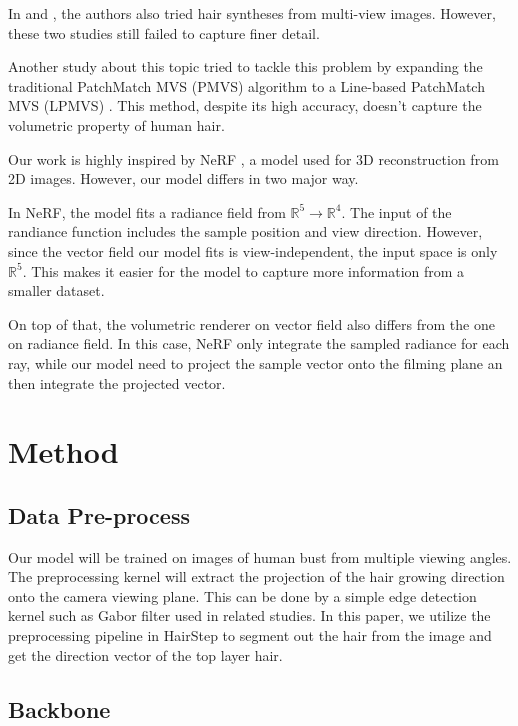 \documentclass[12pt]{article}
\begin{document}
  In \cite{sklyarova_neural_2023} and \cite{rosu_neural_2022}, the authors also tried hair syntheses from multi-view images. However, these two studies still failed to capture finer detail.

  Another study about this topic tried to tackle this problem by expanding the traditional PatchMatch MVS (PMVS) algorithm to a Line-based PatchMatch MVS (LPMVS) \cite{nam_strand-accurate_nodate}. This method, despite its high accuracy, doesn't capture the volumetric property of human hair.

  Our work is highly inspired by NeRF \cite{mildenhall_nerf_2020}, a model used for 3D reconstruction from 2D images. However, our model differs in two major way.

  In NeRF, the model fits a radiance field from $\mathbb{R}^{5} \rightarrow \mathbb{R}^{4}$. The input of the randiance function includes the sample position and view direction. However, since the vector field our model fits is view-independent, the input space is only $\mathbb{R}^{5}$. This makes it easier for the model to capture more information from a smaller dataset.

  On top of that, the volumetric renderer on vector field also differs from the one on radiance field. In this case, NeRF only integrate the sampled radiance for each ray, while our model need to project the sample vector onto the filming plane an then integrate the projected vector.

  \section{Method}
    \subsection{Data Pre-process}

    Our model will be trained on images of human bust from multiple viewing angles. The preprocessing kernel will extract the projection of the hair growing direction onto the camera viewing plane. This can be done by a simple edge detection kernel such as Gabor filter used in related studies. In this paper, we utilize the preprocessing pipeline in HairStep \cite{zheng_hairstep_2023} to segment out the hair from the image and get the direction vector of the top layer hair.
    
    \subsection{Backbone}
    
\end{document}
